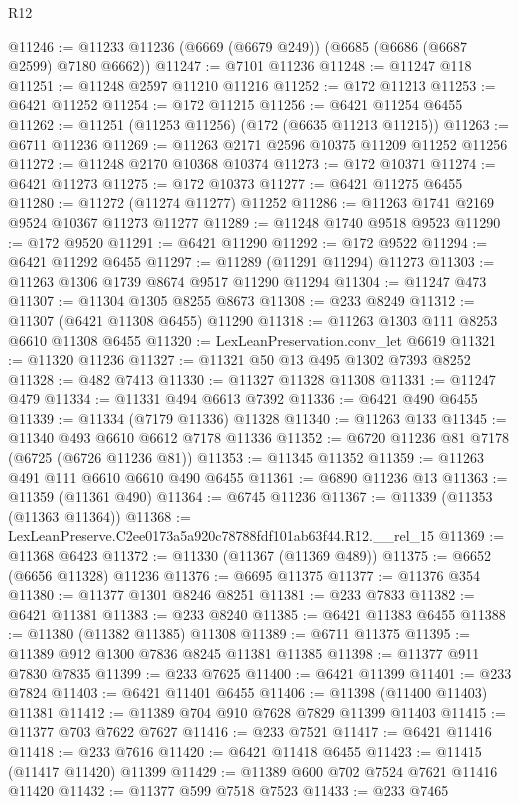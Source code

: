 \begin{lexlean}{R12}
\begin{coremodule}
@11246 := @11233 @11236 (@6669 (@6679 @249)) (@6685 (@6686 (@6687 @2599) @7180 @6662))
@11247 := @7101 @11236
@11248 := @11247 @118
@11251 := @11248 @2597 @11210 @11216
@11252 := @172 @11213
@11253 := @6421 @11252
@11254 := @172 @11215
@11256 := @6421 @11254 @6455
@11262 := @11251 (@11253 @11256) (@172 (@6635 @11213 @11215))
@11263 := @6711 @11236
@11269 := @11263 @2171 @2596 @10375 @11209 @11252 @11256
@11272 := @11248 @2170 @10368 @10374
@11273 := @172 @10371
@11274 := @6421 @11273
@11275 := @172 @10373
@11277 := @6421 @11275 @6455
@11280 := @11272 (@11274 @11277) @11252
@11286 := @11263 @1741 @2169 @9524 @10367 @11273 @11277
@11289 := @11248 @1740 @9518 @9523
@11290 := @172 @9520
@11291 := @6421 @11290
@11292 := @172 @9522
@11294 := @6421 @11292 @6455
@11297 := @11289 (@11291 @11294) @11273
@11303 := @11263 @1306 @1739 @8674 @9517 @11290 @11294
@11304 := @11247 @473
@11307 := @11304 @1305 @8255 @8673
@11308 := @233 @8249
@11312 := @11307 (@6421 @11308 @6455) @11290
@11318 := @11263 @1303 @111 @8253 @6610 @11308 @6455
@11320 := LexLeanPreservation.conv_let @6619
@11321 := @11320 @11236
@11327 := @11321 @50 @13 @495 @1302 @7393 @8252
@11328 := @482 @7413
@11330 := @11327 @11328 @11308
@11331 := @11247 @479
@11334 := @11331 @494 @6613 @7392
@11336 := @6421 @490 @6455
@11339 := @11334 (@7179 @11336) @11328
@11340 := @11263 @133
@11345 := @11340 @493 @6610 @6612 @7178 @11336
@11352 := @6720 @11236 @81 @7178 (@6725 (@6726 @11236 @81))
@11353 := @11345 @11352
@11359 := @11263 @491 @111 @6610 @6610 @490 @6455
@11361 := @6890 @11236 @13
@11363 := @11359 (@11361 @490)
@11364 := @6745 @11236
@11367 := @11339 (@11353 (@11363 @11364))
@11368 := LexLeanPreserve.C2ee0173a5a920c78788fdf101ab63f44.R12.__rel_15
@11369 := @11368 @6423
@11372 := @11330 (@11367 (@11369 @489))
@11375 := @6652 (@6656 @11328) @11236
@11376 := @6695 @11375
@11377 := @11376 @354
@11380 := @11377 @1301 @8246 @8251
@11381 := @233 @7833
@11382 := @6421 @11381
@11383 := @233 @8240
@11385 := @6421 @11383 @6455
@11388 := @11380 (@11382 @11385) @11308
@11389 := @6711 @11375
@11395 := @11389 @912 @1300 @7836 @8245 @11381 @11385
@11398 := @11377 @911 @7830 @7835
@11399 := @233 @7625
@11400 := @6421 @11399
@11401 := @233 @7824
@11403 := @6421 @11401 @6455
@11406 := @11398 (@11400 @11403) @11381
@11412 := @11389 @704 @910 @7628 @7829 @11399 @11403
@11415 := @11377 @703 @7622 @7627
@11416 := @233 @7521
@11417 := @6421 @11416
@11418 := @233 @7616
@11420 := @6421 @11418 @6455
@11423 := @11415 (@11417 @11420) @11399
@11429 := @11389 @600 @702 @7524 @7621 @11416 @11420
@11432 := @11377 @599 @7518 @7523
@11433 := @233 @7465

\end{coremodule}
\end{lexlean}
